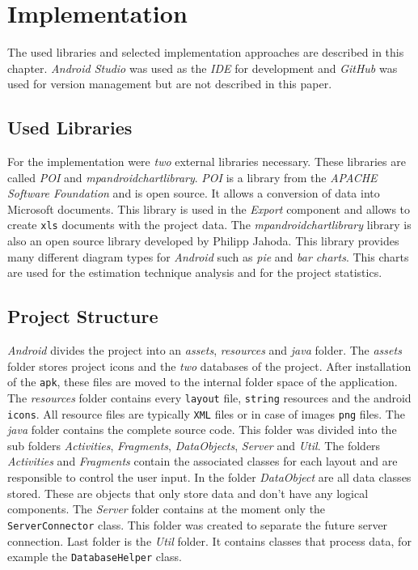 \chapter{Implementation}

The used libraries and selected implementation approaches are described in this chapter. \textit{Android Studio} was used as the \textit{IDE} for development and \textit{GitHub} was used for version management but are not described in this paper.

\section{Used Libraries}

For the implementation were \textit{two} external libraries necessary. These libraries are called \textit{POI} and \textit{mpandroidchartlibrary}. \textit{POI} is a library from the \textit{APACHE Software Foundation} and is open source. It allows a conversion of data into Microsoft documents. This library is used
in the \textit{Export} component and allows to create \texttt{xls} documents with the project data. The \textit{mpandroidchartlibrary} library is also an open source library developed by Philipp Jahoda. This library provides many different diagram types for \textit{Android} such as \textit{pie} and \textit{bar charts}. This charts are used for the estimation technique analysis and for the project statistics. 

\section{Project Structure}

\textit{Android} divides the project into an \textit{assets}, \textit{resources} and \textit{java} folder. The \textit{assets} folder stores project icons and the \textit{two} databases of the project. After installation of the \texttt{apk}, these files are moved to the internal folder space of the application. The \textit{resources} folder contains every \texttt{layout} file, \texttt{string} resources and the android \texttt{icons}. All resource files are typically \texttt{XML} files or in case of images \texttt{png} files. The \textit{java} folder contains the complete source code. This folder was divided into the sub folders \textit{Activities}, \textit{Fragments}, \textit{DataObjects}, \textit{Server} and \textit{Util}. The folders \textit{Activities} and \textit{Fragments} contain the associated classes for each layout and are responsible to control the user input. In the folder \textit{DataObject} are all data classes stored. These are objects that only store data and don't have any logical components. The \textit{Server} folder contains at the moment only the \texttt{ServerConnector} class. This folder was created to separate the future server connection. Last folder is the \textit{Util} folder. It contains classes that process data, for example the \texttt{DatabaseHelper} class.

